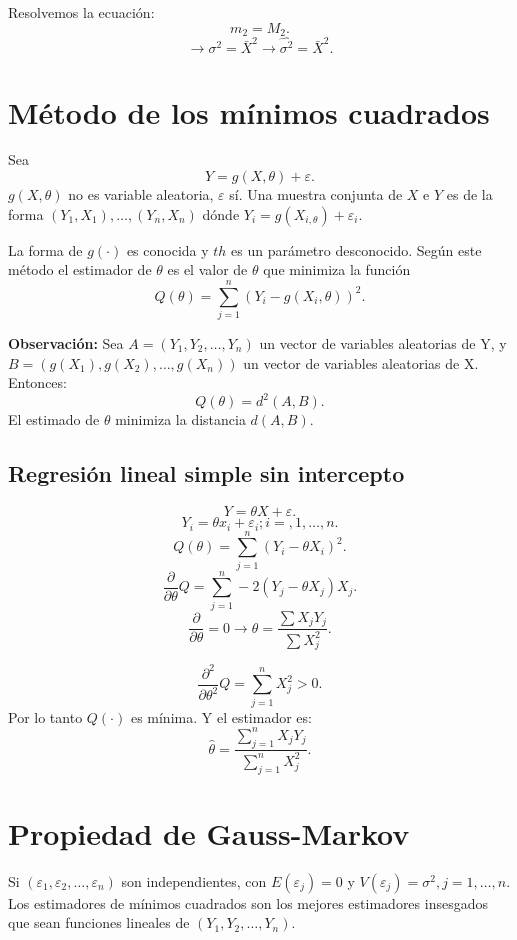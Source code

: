 \documentclass{article}
\begin{document}
Resolvemos la ecuación:
\[ m_{2}=M_{2}.\]
\[ \rightarrow \sigma^{2} = \bar{X}^{2} \rightarrow \hat{\sigma^{2}}=\bar{X}^{2}.\]

\section{Método de los mínimos cuadrados}
Sea
\[ Y = g{(X,\theta)}+\varepsilon.\]
$g{(X,\theta)}$ no es variable aleatoria, $\varepsilon$ sí. Una muestra conjunta de $X$ e $Y$ es de la forma ${(Y_{1},X_{1})}, \ldots ,{(Y_{n},X_{n})}$ dónde $Y_{i} = g{(X_{i,\theta})}+\varepsilon_{i}$.

La forma de $g{(\cdot)}$ es conocida y $th$ es un parámetro desconocido. Según este método el estimador de $\theta$ es el valor de $\theta$ que minimiza la función 
\[ Q{(\theta)}=\sum_{j=1}^{n}{(Y_{i}-g{(X_{i},\theta)})}^{2}.\]

\textbf{Observación: }Sea $A=(Y_{1},Y_{2},\ldots,Y_{n})$ un vector de variables aleatorias de Y, y $B=(g(X_{1}),g(X_{2}),\ldots,g(X_{n}))$ un vector de variables aleatorias de X. Entonces:
\[ Q{(\theta)}=d^{2}{(A,B)}.\]
El estimado de $\theta$ minimiza la distancia $d{(A,B)}$.

\subsection{Regresión lineal simple sin intercepto}
\[ Y=\theta X + \varepsilon.\]
\[ Y_{i}=\theta x_{i}+\varepsilon_{i}; i=,1,\ldots,n.\]
\[ Q{(\theta)}=\sum_{j=1}^{n}{(Y_{i}-\theta X_{i})}^{2}.\]
\[ \frac{\partial }{\partial \theta}Q=\sum_{j=1}^{n} -2{(Y_{j}-\theta X_{j})}X_{j}.\]
\[ \frac{\partial }{\partial \theta}=0 \rightarrow \theta = \frac{\sum X_{j}Y_{j}}{\sum X_{j}^{2}}.\]

\[ \frac{\partial^{2}}{\partial \theta^{2}}Q = \sum_{j=1}^{n} X_{j}^{2} > 0.\]
Por lo tanto $Q{(\cdot)}$ es mínima. Y el estimador es:
\[ \hat{\theta}=\frac{\sum_{j=1}^{n}X_{j}Y_{j}}{\sum_{j=1}^{n}X_{j}^{2}}.\]

\section{Propiedad de Gauss-Markov}
Si $(\varepsilon_{1},\varepsilon_{2},\ldots,\varepsilon_{n})$ son independientes, con $E{(\varepsilon_{j})}=0$ y $V{(\varepsilon_{j})}=\sigma^{2}, j=1,\ldots,n$. Los estimadores de mínimos cuadrados son los mejores estimadores insesgados que sean funciones lineales de $(Y_{1},Y_{2},\ldots,Y_{n})$.
\end{document}
